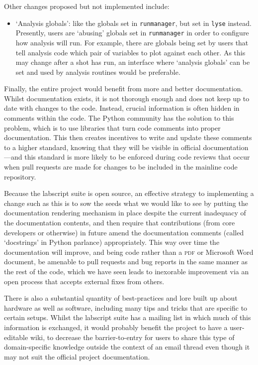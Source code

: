 Other changes proposed but not implemented include:

\begin{itemize}
\item `Analysis globals': like the globals set in \texttt{runmanager}, but set in \texttt{lyse} instead. Presently, users are `abusing' globals set in \texttt{runmanager} in order to configure how analysis will run. For example, there are globals being set by users that tell analysis code which pair of variables to plot against each other. As this may change after a shot has run, an interface where `analysis globals' can be set and used by analysis routines would be preferable.
\end{itemize}

Finally, the entire project would benefit from more and better documentation. Whilst documentation exists, it is not thorough enough and does not keep up to date with changes to the code. Instead, crucial information is often hidden in comments within the code. The Python community has the solution to this problem, which is to use libraries that turn code comments into proper documentation. This then creates incentives to write and update these comments to a higher standard, knowing that they will be visible in official documentation---and this standard is more likely to be enforced during code reviews that occur when pull requests are made for changes to be included in the mainline code repository.

Because the labscript suite is open source, an effective strategy to implementing a change such as this is to sow the seeds what we would like to see by putting the documentation rendering mechanism in place despite the current inadequacy of the documentation contents, and then require that contributions (from core developers or otherwise) in future amend the documentation comments (called `docstrings' in Python parlance) appropriately. This way over time the documentation will improve, and being code rather than a \textsc{pdf} or Microsoft Word document, be amenable to pull requests and bug reports in the same manner as the rest of the code, which we have seen leads to inexorable improvement via an open process that accepts external fixes from others.

There is also a substantial quantity of best-practices and lore built up about hardware as well as software, including many tips and tricks that are specific to certain setups. Whilst the labscript suite has a mailing list in which much of this information is exchanged, it would probably benefit the project to have a user-editable wiki, to decrease the barrier-to-entry for users to share this type of domain-specific knowledge outside the context of an email thread even though it may not suit the official project documentation.



